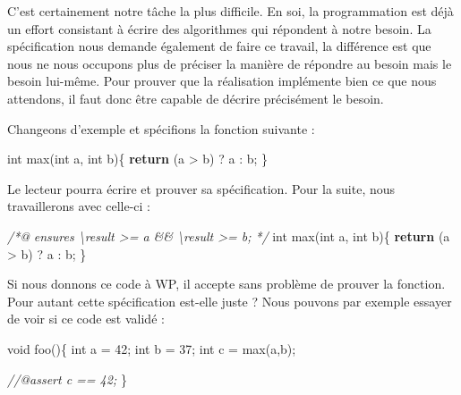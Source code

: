 \documentclass[12pt,francais,]{scrbook}
\newenvironment{Shaded}{}{}
\newcommand{\KeywordTok}[1]{\textcolor[rgb]{0.00,0.44,0.13}{\textbf{{#1}}}}
\newcommand{\DataTypeTok}[1]{\textcolor[rgb]{0.56,0.13,0.00}{{#1}}}
\newcommand{\DecValTok}[1]{\textcolor[rgb]{0.25,0.63,0.44}{{#1}}}
\newcommand{\CommentTok}[1]{\textcolor[rgb]{0.38,0.63,0.69}{\textit{{#1}}}}
\newcommand{\NormalTok}[1]{{#1}}
\begin{document}
C'est certainement notre tâche la plus difficile. En soi, la
programmation est déjà un effort consistant à écrire des algorithmes qui
répondent à notre besoin. La spécification nous demande également de
faire ce travail, la différence est que nous ne nous occupons plus de
préciser la manière de répondre au besoin mais le besoin lui-même. Pour
prouver que la réalisation implémente bien ce que nous attendons, il
faut donc être capable de décrire précisément le besoin.

Changeons d'exemple et spécifions la fonction suivante :

\begin{footnotesize}\begin{Shaded}
\begin{Highlighting}[]
\DataTypeTok{int} \NormalTok{max(}\DataTypeTok{int} \NormalTok{a, }\DataTypeTok{int} \NormalTok{b)\{}
  \KeywordTok{return} \NormalTok{(a > b) ? a : b;}
\NormalTok{\}}
\end{Highlighting}
\end{Shaded}\end{footnotesize}

Le lecteur pourra écrire et prouver sa spécification. Pour la suite,
nous travaillerons avec celle-ci :

\begin{footnotesize}\begin{Shaded}
\begin{Highlighting}[]
\CommentTok{/*@}
\CommentTok{  ensures \textbackslash{}result >= a && \textbackslash{}result >= b;}
\CommentTok{*/}
\DataTypeTok{int} \NormalTok{max(}\DataTypeTok{int} \NormalTok{a, }\DataTypeTok{int} \NormalTok{b)\{}
  \KeywordTok{return} \NormalTok{(a > b) ? a : b;}
\NormalTok{\}}
\end{Highlighting}
\end{Shaded}\end{footnotesize}

Si nous donnons ce code à WP, il accepte sans problème de prouver la
fonction. Pour autant cette spécification est-elle juste ? Nous pouvons
par exemple essayer de voir si ce code est validé :

\begin{footnotesize}\begin{Shaded}
\begin{Highlighting}[]
\DataTypeTok{void} \NormalTok{foo()\{}
  \DataTypeTok{int} \NormalTok{a = }\DecValTok{42}\NormalTok{;}
  \DataTypeTok{int} \NormalTok{b = }\DecValTok{37}\NormalTok{;}
  \DataTypeTok{int} \NormalTok{c = max(a,b);}

  \CommentTok{//@assert c == 42;}
\NormalTok{\}}
\end{Highlighting}
\end{Shaded}\end{footnotesize}
\end{document}
